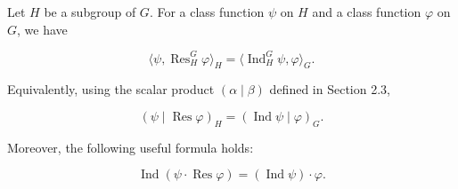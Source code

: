 Let $H$ be a subgroup of $G$. For a class function $\psi$ on $H$ and a class function $\varphi$ on $G$, we have

$$\langle \psi, \operatorname{Res}_H^G \varphi \rangle_H = \langle \operatorname{Ind}_H^G \psi, \varphi \rangle_G.$$

Equivalently, using the scalar product $(\alpha \mid \beta)$ defined in Section 2.3,

$$(\psi \mid \operatorname{Res} \varphi)_H = (\operatorname{Ind} \psi \mid \varphi)_G.$$

Moreover, the following useful formula holds:

$$\operatorname{Ind}(\psi \cdot \operatorname{Res} \varphi) = (\operatorname{Ind} \psi) \cdot \varphi.$$
